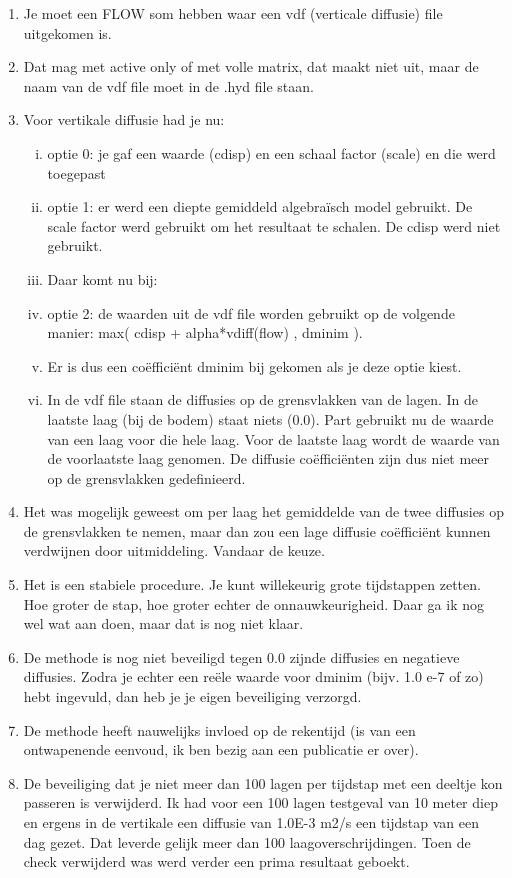 \documentclass[english]{deltares_manual}
\begin{document}
\begin{enumerate}
\item Je moet een FLOW som hebben waar een vdf (verticale diffusie) file uitgekomen is.
\item Dat mag met active only of met volle matrix, dat maakt niet uit, maar de naam van de vdf file moet in de .hyd file staan.
\item Voor vertikale diffusie had je nu:
\begin{enumerate}[(i)]
\item optie 0: je gaf een waarde (cdisp) en een schaal factor (scale) en die werd toegepast
\item optie 1: er werd een diepte gemiddeld algebraïsch model gebruikt. De scale factor werd gebruikt om het resultaat te schalen. De cdisp werd niet gebruikt.
\item Daar komt nu bij:
\item optie 2: de waarden uit de vdf file worden gebruikt op de volgende manier: max( cdisp + alpha*vdiff(flow) , dminim ).
\item Er is dus een coëfficiënt dminim bij gekomen als je deze optie kiest.
\item In de vdf file staan de diffusies op de grensvlakken van de lagen. In de laatste laag (bij de bodem) staat niets (0.0). Part gebruikt nu de waarde van een laag voor die hele laag. Voor de laatste laag wordt de waarde van de voorlaatste laag genomen. De diffusie coëfficiënten zijn dus niet meer op de grensvlakken gedefinieerd.
\end{enumerate}
\item Het was mogelijk geweest om per laag het gemiddelde van de twee diffusies op de grensvlakken te nemen, maar dan zou een lage diffusie coëfficiënt kunnen verdwijnen door uitmiddeling. Vandaar de keuze.
\item Het is een stabiele procedure. Je kunt willekeurig grote tijdstappen zetten. Hoe groter de stap, hoe groter echter de onnauwkeurigheid. Daar ga ik nog wel wat aan doen, maar dat is nog niet klaar.
\item De methode is nog niet beveiligd tegen 0.0 zijnde diffusies en negatieve diffusies. Zodra je echter een reële waarde voor dminim (bijv. 1.0 e-7 of zo) hebt ingevuld, dan heb je je eigen beveiliging verzorgd.
\item De methode heeft nauwelijks invloed op de rekentijd (is van een ontwapenende eenvoud, ik ben bezig aan een publicatie er over).
\item De beveiliging dat je niet meer dan 100 lagen per tijdstap met een deeltje kon passeren is verwijderd. Ik had voor een 100 lagen testgeval van 10 meter diep en ergens in de vertikale een diffusie van 1.0E-3 m2/s een tijdstap van een dag gezet. Dat leverde gelijk meer dan 100 laagoverschrijdingen. Toen de check verwijderd was werd verder een prima resultaat geboekt.
\end{enumerate}
\end{document}
